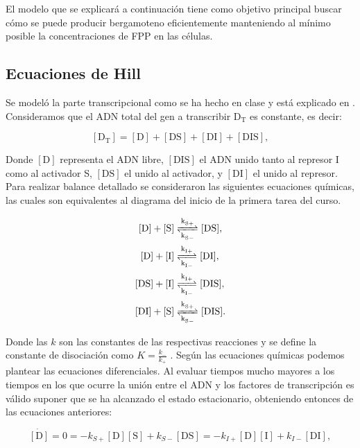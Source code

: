 \documentclass[12pt]{article}
\begin{document}
El modelo que se explicar\'a a continuaci\'on tiene como objetivo principal buscar c\'omo se puede producir bergamoteno eficientemente manteniendo al m\'inimo posible la concentraciones de FPP en las c\'elulas.\\

\subsection{Ecuaciones de Hill}

Se model\'o la parte transcripcional como se ha hecho en clase y est\'a explicado en \cite{alon06}. Consideramos que el ADN total del gen a transcribir $\text{D}_{\text{T}}$ es constante, es decir:

\begin{equation} \label{eq:D_T}
[\text{D}_{\text{T}}]=[\text{D}]+[\text{DS}]+[\text{DI}]+[\text{DIS}],
\end{equation}

Donde $[\text{D}]$ representa el ADN libre, $[\text{DIS}]$ el ADN unido tanto al represor I como al activador S, $[\text{DS}]$ el unido al activador, y $[\text{DI}]$ el unido al represor.\\

Para realizar balance detallado se consideraron las siguientes ecuaciones qu\'imicas, las cuales son equivalentes al diagrama del inicio  de la primera tarea del curso.

\begin{align}
\ce{[D] + [S]} &\ce{<=>[\ce{k_{S+}}][\ce{k_{S-}}] [DS]}, \label{eq:rchem1}\\ 
\ce{[D] + [I]} &\ce{<=>[\ce{k_{I+}}][\ce{k_{I-}}] [DI]}, \label{eq:rchem2}\\
\ce{[DS] + [I]} &\ce{ <=>[\ce{k_{I+}}][\ce{k_{I-}}] [DIS]}, \label{eq:rchem3}\\ 
\ce{[DI] + [S]} &\ce{<=>[\ce{k_{S+}}][\ce{k_{S-}}] [DIS]}. \label{eq:rchem4}
\end{align}

Donde las $k$ son las constantes de las respectivas reacciones y se define la constante de disociaci\'on como $K = \frac{k_-}{k_+}$ \cite{alon06}. Seg\'un las ecuaciones qu\'imicas podemos plantear las ecuaciones diferenciales. Al evaluar tiempos mucho mayores a los tiempos en los que ocurre la uni\'on entre el ADN y los factores de transcripci\'on es v\'alido suponer que se ha alcanzado el estado estacionario, obteniendo entonces de las ecuaciones anteriores:

\begin{equation}
\label{eq:Dss}
\dot{[\text{D}]}=0=-k_{S+}[\text{D}][\text{S}]+k_{S-}[\text{DS}]=-k_{I+}[\text{D}][\text{I}]+k_{I-}[\text{DI}],
\end{equation}
\end{document}
